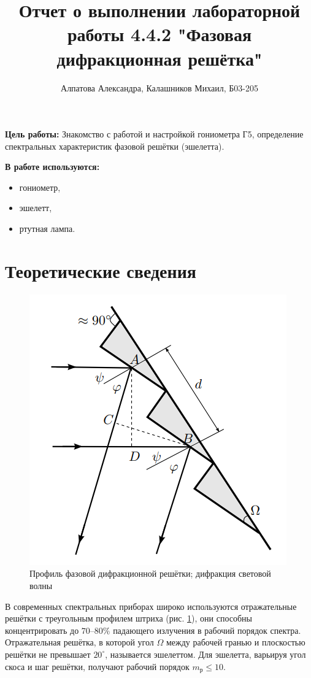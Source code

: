 \documentclass[14pt, a4paper]{report}
\title{\textbf{Отчет о выполнении лабораторной работы 4.4.2 "Фазовая дифракционная решётка"}}
\author{Алпатова Александра, Калашников Михаил, Б03-205}
\date{}
\begin{document}
\maketitle

\textbf{Цель работы:}
Знакомство с работой и настройкой гониометра Г5, определение спектральных характеристик фазовой решётки (эшелетта).
\newline

\textbf{В работе используются:}
\begin{itemize}
\item гониометр,
\item эшелетт,
\item ртутная лампа.
\end{itemize}

\section{Теоретические сведения}

\begin{figure}[H]
	\centering
	\includegraphics[width=0.5\linewidth]{../images/442_7}
	\caption{Профиль фазовой дифракционной решётки; дифракция световой волны}
	\label{fig:решёткаВпрофиль}
\end{figure}

В современных спектральных приборах широко используются отражательные решётки с треугольным профилем штриха (рис. \ref{fig:решёткаВпрофиль}), они способны концентрировать до $ 70–80\% $ падающего излучения в рабочий порядок спектра. Отражательная решётка, в которой угол $ \Omega $ между рабочей гранью и плоскостью решётки не превышает $ 20^\circ $, называется эшелеттом. Для эшелетта, варьируя угол скоса и шаг решётки, получают рабочий порядок $ m_р \le 10 $.
\end{document}
